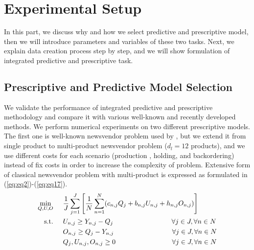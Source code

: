 \documentclass[12pt]{article}
\begin{document}
\section{Experimental Setup}
In this part, we discuss why and how we select predictive and prescriptive model, then we will introduce parameters and variables of these two tasks. Next, we explain data creation process step by step, and we will show formulation of integrated predictive and prescriptive task. 

\subsection{Prescriptive and Predictive Model Selection}
We validate the performance of integrated predictive and prescriptive methodology and compare it with various well-known and recently developed methods. We perform numerical experiments on two different prescriptive models. The first one is well-known newsvendor problem used by \cite{Ban2019TheBD}, but we extend it from single product to multi-product newsvendor problem ($d_l=12$ products), and we use different costs for each scenario (production , holding, and backordering) instead of fix costs in order to increase the complexity of problem. 
Extensive form of classical newsvendor problem with multi-product is expressed as formulated in (\ref{eq:eq2})-(\ref{eq:eq17}).
\begin{subequations}
\begin{flalign}
\min\limits_{Q,U,O} \hspace{5 mm} & \frac{1}{J}\sum\limits_{j=1}^{J}\left[ \frac{1}{N}\sum\limits_{n=1}^{N}(c_{n,j}Q_j+b_{n,j}U_{n,j}+h_{n,j}O_{n,j})\right] \label{eq:eq2}\\
\textrm{s.t.} \hspace{5 mm} & U_{n,j} \geq Y_{n,j}-Q_j \hspace{30 mm} \forall j \in J, \forall n \in N\\
&O_{n,j} \geq Q_j-Y_{n,j} \hspace{30 mm} \forall j \in J, \forall n \in N\\
&Q_{j}, U_{n,j},O_{n,j}\geq 0 \hspace{29 mm} \forall j \in J, \forall n \in N \label{eq:eq17}
\end{flalign}
\end{subequations}
\end{document}
